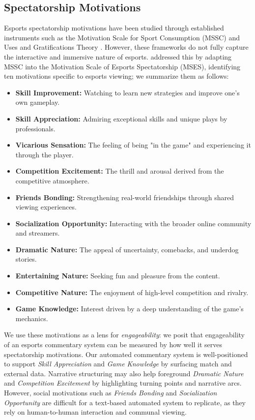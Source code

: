 \subsection{Spectatorship Motivations}
\label{sec:mses-motivations}
Esports spectatorship motivations have been studied through established instruments such as the Motivation Scale for Sport Consumption (MSSC) \cite{trail2001,hamari2017,sjoblom2018} and Uses and Gratifications Theory \cite{katz1973,sjoblom2017}. However, these frameworks do not fully capture the interactive and immersive nature of esports. \citet{qian2020} addressed this by adapting MSSC into the Motivation Scale of Esports Spectatorship (MSES), identifying ten motivations specific to esports viewing; we summarize them as follows:
\begin{itemize}
  \item \textbf{Skill Improvement:} Watching to learn new strategies and improve one's own gameplay.
  \item \textbf{Skill Appreciation:} Admiring exceptional skills and unique plays by professionals.
  \item \textbf{Vicarious Sensation:} The feeling of being "in the game" and experiencing it through the player.
  \item \textbf{Competition Excitement:} The thrill and arousal derived from the competitive atmosphere.
  \item \textbf{Friends Bonding:} Strengthening real-world friendships through shared viewing experiences.
  \item \textbf{Socialization Opportunity:} Interacting with the broader online community and streamers.
  \item \textbf{Dramatic Nature:} The appeal of uncertainty, comebacks, and underdog stories.
  \item \textbf{Entertaining Nature:} Seeking fun and pleasure from the content.
  \item \textbf{Competitive Nature:} The enjoyment of high-level competition and rivalry.
  \item \textbf{Game Knowledge:} Interest driven by a deep understanding of the game's mechanics.
\end{itemize}

We use these motivations as a lens for \textit{engageability}: we posit that engageability of an esports commentary system can be measured by how well it serves spectatorship motivations. Our automated commentary system is well-positioned to support \textit{Skill Appreciation} and \textit{Game Knowledge} by surfacing match and external data. Narrative structuring may also help foreground \textit{Dramatic Nature} and \textit{Competition Excitement} by highlighting turning points and narrative arcs. However, social motivations such as \textit{Friends Bonding} and \textit{Socialization Opportunity} are difficult for a text-based automated system to replicate, as they rely on human-to-human interaction and communal viewing.

